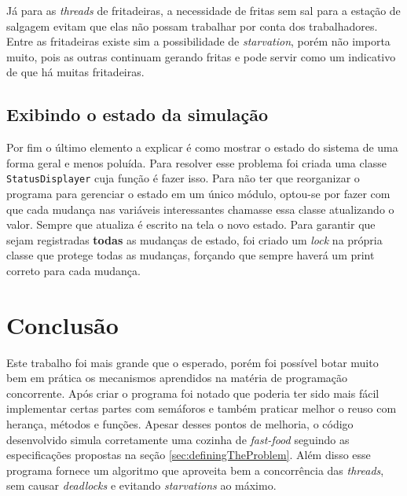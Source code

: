 \documentclass[a4paper]{article}
\begin{document}
Já para as \textit{threads} de fritadeiras, a necessidade de fritas sem sal para a estação de salgagem evitam que elas não possam trabalhar por conta dos trabalhadores. Entre as fritadeiras existe sim a possibilidade de \textit{starvation}, porém não importa muito, pois as outras continuam gerando fritas e pode servir como um indicativo de que há muitas fritadeiras.

\subsection{Exibindo o estado da simulação}
\label{sec:showProgramState}

Por fim o último elemento a explicar é como mostrar o estado do sistema de uma forma geral e menos poluída. Para resolver esse problema foi criada uma classe \texttt{StatusDisplayer} cuja função é fazer isso. Para não ter que reorganizar o programa para gerenciar o estado em um único módulo, optou-se por fazer com que cada mudança nas variáveis interessantes chamasse essa classe atualizando o valor. Sempre que atualiza é escrito na tela o novo estado. Para garantir que sejam registradas \textbf{todas} as mudanças de estado, foi criado um \textit{lock} na própria classe que protege todas as mudanças, forçando que sempre haverá um print correto para cada mudança.

\section{Conclusão}

Este trabalho foi mais grande que o esperado, porém foi possível botar muito bem em prática os mecanismos aprendidos na matéria de programação concorrente. Após criar o programa foi notado que poderia ter sido mais fácil implementar certas partes com semáforos e também praticar melhor o reuso com herança, métodos e funções. Apesar desses pontos de melhoria, o código desenvolvido simula corretamente uma cozinha de \textit{fast-food} seguindo as especificações propostas na seção \ref{sec:definingTheProblem}. Além disso esse programa fornece um algoritmo que aproveita bem a concorrência das \textit{threads}, sem causar \textit{deadlocks} e evitando \textit{starvations} ao máximo.

\nocite{cppreference.com}
\nocite{blaise_barney}
\printbibliography
\end{document}
